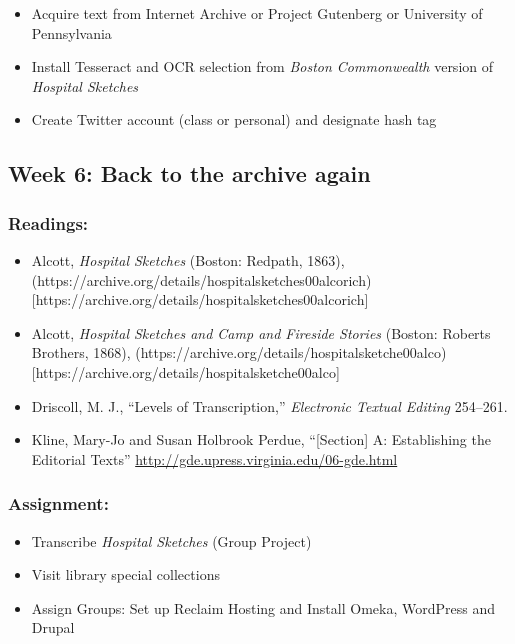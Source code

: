 \documentclass[]{article}
\begin{document}
\begin{itemize}
\itemsep1pt\parskip0pt
\item
  Acquire text from Internet Archive or Project Gutenberg or University
  of Pennsylvania
\item
  Install Tesseract and OCR selection from \emph{Boston Commonwealth}
  version of \emph{Hospital Sketches}
\item
  Create Twitter account (class or personal) and designate hash tag
\end{itemize}

\subsection{Week 6: Back to the archive
again}\label{week-6-back-to-the-archive-again}

\subsubsection{Readings:}\label{readings-4}

\begin{itemize}
\itemsep1pt\parskip0pt
\item
  Alcott, \emph{Hospital Sketches} (Boston: Redpath, 1863),
  (https://archive.org/details/hospitalsketches00alcorich){[}https://archive.org/details/hospitalsketches00alcorich{]}
\item
  Alcott, \emph{Hospital Sketches and Camp and Fireside Stories}
  (Boston: Roberts Brothers, 1868),
  (https://archive.org/details/hospitalsketche00alco){[}https://archive.org/details/hospitalsketche00alco{]}
\item
  Driscoll, M. J., ``Levels of Transcription,'' \emph{Electronic Textual
  Editing} 254--261.
\item
  Kline, Mary-Jo and Susan Holbrook Perdue, ``{[}Section{]} A:
  Establishing the Editorial Texts''
  \url{http://gde.upress.virginia.edu/06-gde.html}
\end{itemize}

\subsubsection{Assignment:}\label{assignment-4}

\begin{itemize}
\itemsep1pt\parskip0pt
\item
  Transcribe \emph{Hospital Sketches} (Group Project)
\item
  Visit library special collections
\item
  Assign Groups: Set up Reclaim Hosting and Install Omeka, WordPress and
  Drupal
\end{itemize}
\end{document}
